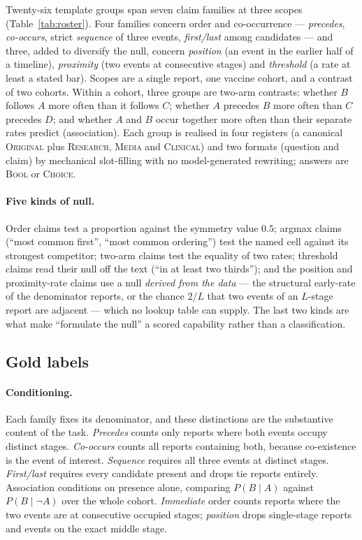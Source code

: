 Twenty-six template groups span seven claim families at three scopes
(Table~\ref{tab:roster}). Four families concern order and co-occurrence ---
\emph{precedes}, \emph{co-occurs}, strict \emph{sequence} of three events,
\emph{first/last} among candidates --- and three, added to diversify the null,
concern \emph{position} (an event in the earlier half of a timeline),
\emph{proximity} (two events at consecutive stages) and \emph{threshold} (a
rate at least a stated bar). Scopes are a single report, one vaccine cohort,
and a contrast of two cohorts. Within a cohort, three groups are two-arm
contrasts: whether $B$ follows $A$ more often than it follows $C$; whether $A$
precedes $B$ more often than $C$ precedes $D$; and whether $A$ and $B$ occur
together more often than their separate rates predict (association). Each
group is realised in four registers (a canonical \textsc{Original} plus
\textsc{Research}, \textsc{Media} and \textsc{Clinical}) and two formats
(question and claim) by mechanical slot-filling with no model-generated
rewriting; answers are \textsc{Bool} or \textsc{Choice}.

\paragraph{Five kinds of null.} Order claims test a proportion against the
symmetry value $0.5$; argmax claims (``most common first'', ``most common
ordering'') test the named cell against its strongest competitor; two-arm
claims test the equality of two rates; threshold claims read their null off
the text (``in at least two thirds''); and the position and proximity-rate
claims use a null \emph{derived from the data} --- the structural early-rate of
the denominator reports, or the chance $2/L$ that two events of an $L$-stage
report are adjacent --- which no lookup table can supply. The last two kinds
are what make ``formulate the null'' a scored capability rather than a
classification.

\subsection{Gold labels}
\label{sec:gold}

\paragraph{Conditioning.} Each family fixes its denominator, and these
distinctions are the substantive content of the task. \emph{Precedes} counts
only reports where both events occupy distinct stages. \emph{Co-occurs} counts
all reports containing both, because co-existence is the event of interest.
\emph{Sequence} requires all three events at distinct stages. \emph{First/last}
requires every candidate present and drops tie reports entirely. Association
conditions on presence alone, comparing $P(B \mid A)$ against $P(B \mid \neg
A)$ over the whole cohort. \emph{Immediate} order counts reports where the two
events are at consecutive occupied stages; \emph{position} drops single-stage
reports and events on the exact middle stage.

